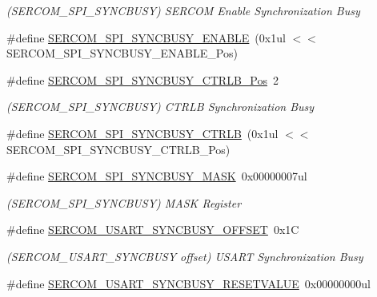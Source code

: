 \begin{DoxyCompactItemize}
\begin{DoxyCompactList}\small\item\em (S\+E\+R\+C\+O\+M\+\_\+\+S\+P\+I\+\_\+\+S\+Y\+N\+C\+B\+U\+SY) S\+E\+R\+C\+OM Enable Synchronization Busy \end{DoxyCompactList}\item 
\#define \mbox{\hyperlink{group___s_a_m_d21___s_e_r_c_o_m_gab5cdfadb41e797615bda4732f8b10e89}{S\+E\+R\+C\+O\+M\+\_\+\+S\+P\+I\+\_\+\+S\+Y\+N\+C\+B\+U\+S\+Y\+\_\+\+E\+N\+A\+B\+LE}}~(0x1ul $<$$<$ S\+E\+R\+C\+O\+M\+\_\+\+S\+P\+I\+\_\+\+S\+Y\+N\+C\+B\+U\+S\+Y\+\_\+\+E\+N\+A\+B\+L\+E\+\_\+\+Pos)
\item 
\#define \mbox{\hyperlink{group___s_a_m_d21___s_e_r_c_o_m_gaa0e9ff23ebbc42d93b7830ecda0058ab}{S\+E\+R\+C\+O\+M\+\_\+\+S\+P\+I\+\_\+\+S\+Y\+N\+C\+B\+U\+S\+Y\+\_\+\+C\+T\+R\+L\+B\+\_\+\+Pos}}~2
\begin{DoxyCompactList}\small\item\em (S\+E\+R\+C\+O\+M\+\_\+\+S\+P\+I\+\_\+\+S\+Y\+N\+C\+B\+U\+SY) C\+T\+R\+LB Synchronization Busy \end{DoxyCompactList}\item 
\#define \mbox{\hyperlink{group___s_a_m_d21___s_e_r_c_o_m_ga4c26926c60fdd321c81d6fdd4208929c}{S\+E\+R\+C\+O\+M\+\_\+\+S\+P\+I\+\_\+\+S\+Y\+N\+C\+B\+U\+S\+Y\+\_\+\+C\+T\+R\+LB}}~(0x1ul $<$$<$ S\+E\+R\+C\+O\+M\+\_\+\+S\+P\+I\+\_\+\+S\+Y\+N\+C\+B\+U\+S\+Y\+\_\+\+C\+T\+R\+L\+B\+\_\+\+Pos)
\item 
\#define \mbox{\hyperlink{group___s_a_m_d21___s_e_r_c_o_m_ga8692da7f26c5c11f01cc172fb4203554}{S\+E\+R\+C\+O\+M\+\_\+\+S\+P\+I\+\_\+\+S\+Y\+N\+C\+B\+U\+S\+Y\+\_\+\+M\+A\+SK}}~0x00000007ul
\begin{DoxyCompactList}\small\item\em (S\+E\+R\+C\+O\+M\+\_\+\+S\+P\+I\+\_\+\+S\+Y\+N\+C\+B\+U\+SY) M\+A\+SK Register \end{DoxyCompactList}\item 
\#define \mbox{\hyperlink{group___s_a_m_d21___s_e_r_c_o_m_ga1557d3396322169756146fd3623e8320}{S\+E\+R\+C\+O\+M\+\_\+\+U\+S\+A\+R\+T\+\_\+\+S\+Y\+N\+C\+B\+U\+S\+Y\+\_\+\+O\+F\+F\+S\+ET}}~0x1C
\begin{DoxyCompactList}\small\item\em (S\+E\+R\+C\+O\+M\+\_\+\+U\+S\+A\+R\+T\+\_\+\+S\+Y\+N\+C\+B\+U\+SY offset) U\+S\+A\+RT Synchronization Busy \end{DoxyCompactList}\item 
\#define \mbox{\hyperlink{group___s_a_m_d21___s_e_r_c_o_m_gaf32900cc1fa0e2f4f570733664d2268c}{S\+E\+R\+C\+O\+M\+\_\+\+U\+S\+A\+R\+T\+\_\+\+S\+Y\+N\+C\+B\+U\+S\+Y\+\_\+\+R\+E\+S\+E\+T\+V\+A\+L\+UE}}~0x00000000ul

\end{DoxyCompactItemize}

